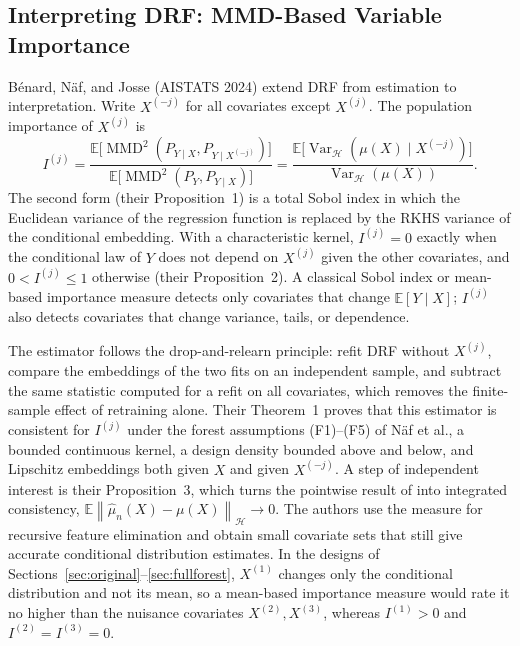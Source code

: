 \documentclass[12pt,a4paper]{article}
\newcommand{\E}{\mathbb E}
\newcommand{\calH}{\mathcal H}
\newcommand{\MMD}{\operatorname{MMD}}
\newcommand{\Var}{\operatorname{Var}}
\newcommand{\1}{\mathbf 1}
\newcommand{\norm}[1]{\left\lVert#1\right\rVert}
\begin{document}
\subsection{Interpreting DRF: MMD-Based Variable Importance}\label{sec:importance}
B\'enard, N\"af, and Josse \cite{benard2024} (AISTATS 2024) extend DRF from estimation to interpretation. Write $X^{(-j)}$ for all covariates except $X^{(j)}$. The population importance of $X^{(j)}$ is
\begin{equation}\label{eq:mmdimportance}
 I^{(j)}=\frac{\E\big[\MMD^2(P_{Y\mid X},P_{Y\mid X^{(-j)}})\big]}{\E\big[\MMD^2(P_Y,P_{Y\mid X})\big]}
 =\frac{\E\big[\Var_{\calH}(\mu(X)\mid X^{(-j)})\big]}{\Var_{\calH}(\mu(X))}.
\end{equation}
The second form (their Proposition~1) is a total Sobol index in which the Euclidean variance of the regression function is replaced by the RKHS variance of the conditional embedding. With a characteristic kernel, $I^{(j)}=0$ exactly when the conditional law of $Y$ does not depend on $X^{(j)}$ given the other covariates, and $0<I^{(j)}\le1$ otherwise (their Proposition~2). A classical Sobol index or mean-based importance measure detects only covariates that change $\E[Y\mid X]$; $I^{(j)}$ also detects covariates that change variance, tails, or dependence.

The estimator follows the drop-and-relearn principle: refit DRF without $X^{(j)}$, compare the embeddings of the two fits on an independent sample, and subtract the same statistic computed for a refit on all covariates, which removes the finite-sample effect of retraining alone. Their Theorem~1 proves that this estimator is consistent for $I^{(j)}$ under the forest assumptions (F1)--(F5) of N\"af et al., a bounded continuous kernel, a design density bounded above and below, and Lipschitz embeddings both given $X$ and given $X^{(-j)}$. A step of independent interest is their Proposition~3, which turns the pointwise result of \cite[Theorem~2]{cevid2022} into integrated consistency, $\E\norm{\widehat\mu_n(X)-\mu(X)}_{\calH}\to0$. The authors use the measure for recursive feature elimination and obtain small covariate sets that still give accurate conditional distribution estimates. In the designs of Sections~\ref{sec:original}--\ref{sec:fullforest}, $X^{(1)}$ changes only the conditional distribution and not its mean, so a mean-based importance measure would rate it no higher than the nuisance covariates $X^{(2)},X^{(3)}$, whereas $I^{(1)}>0$ and $I^{(2)}=I^{(3)}=0$.
\end{document}
